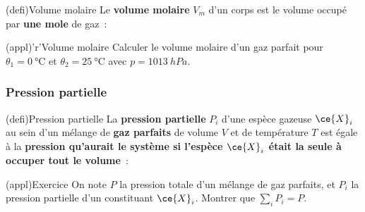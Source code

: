 \documentclass[../../main/main.tex]{subfiles}
\begin{document}
\begin{tcbraster}[raster columns=2, raster equal height=rows]
	\begin{tcb}[label=def:volmol](defi){Volume molaire}
		Le \textbf{volume molaire} $V_m$ d'un corps est le volume occupé par
		\textbf{une mole} de gaz~:
		\csw{
			\[\boxed{V_m = \frac{V}{n}} \Leftrightarrow n = \frac{V}{V_m}\]
		}
	\end{tcb}
	\begin{tcb}[label=exem:volmol](appl)'r'{Volume molaire}
		Calculer le volume molaire d'un gaz parfait pour $\theta_1 =
			\SI{0}{\degreeCelsius}$ et $\theta_2 = \SI{25}{\degreeCelsius}$ avec $p
			= \SI{1013}{hPa}$.
		\tcblower

	\end{tcb}
\end{tcbraster}

\subsubsection{Pression partielle}
\begin{tcb}[label=def:ppartielle](defi){Pression partielle}
	La \textbf{pression partielle} $P_i$ d'une espèce gazeuse $\ce{X}_i$ au
	sein d'un mélange de \textbf{gaz parfaits} de volume $V$ et de température $T$ est
	égale à la \textbf{pression qu'aurait le système si l'espèce $\ce{X}_i$
		était la seule à occuper tout le volume}~:
	\csw{
		\[\boxed{P_iV = n_{g,i} RT}\]
	}
\end{tcb}
\begin{tcb}[width=\linewidth](appl){Exercice}
	On note $P$ la pression totale d'un mélange de gaz parfaits, et $P_i$ la
	pression partielle d'un constituant $\ce{X}_i$. Montrer que $\sum_i P_i = P$.
	\tcblower
	\csw{
		\[
			\sum_i P_i = \sum_i \frac{n_{g,i}RT}{V} = \frac{RT}{V} \sum_i n_{g,i} =
			\frac{n_{g,\tot}RT}{V} = P
			\qed
		\]
	}
\end{tcb}
\end{document}
